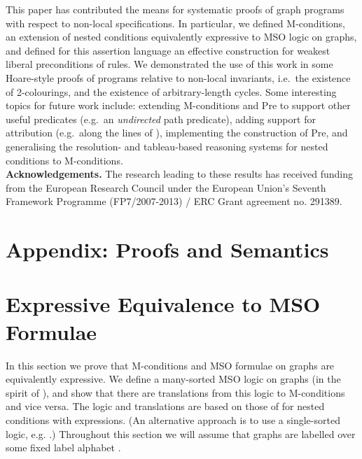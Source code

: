 \documentclass{llncs}
\begin{document}
	This paper has contributed the means for systematic proofs of graph programs with respect to non-local specifications. In particular, we defined M-conditions, an extension of nested conditions equivalently expressive to MSO logic on graphs, and defined for this assertion language an effective construction for weakest liberal preconditions of rules. We demonstrated the use of this work in some Hoare-style proofs of programs relative to non-local invariants, i.e.\ the existence of 2-colourings, and the existence of arbitrary-length cycles. Some interesting topics for future work include: extending M-conditions and Pre to support other useful predicates (e.g.\ an \emph{undirected} path predicate), adding support for attribution (e.g.\ along the lines of \cite{Poskitt-Plump12a,Poskitt13a}), implementing the construction of Pre, and generalising the resolution- and tableau-based reasoning systems for nested conditions \cite{Pennemann08a,Lambers-Orejas14a} to M-conditions.\\
	
	\noindent \textbf{Acknowledgements.} The research leading to these results has received funding from the
	European Research Council under the European Union's Seventh Framework
	Programme (FP7/2007-2013) / ERC Grant agreement no. 291389.

	
	
	
	
	\newpage\appendix
	
	\section*{Appendix: Proofs and Semantics}
	
	\section{Expressive Equivalence to MSO Formulae}\label{app:proofs:expressiveness}
	
	In this section we prove that M-conditions and MSO formulae on graphs are equivalently expressive. We define a many-sorted MSO logic on graphs (in the spirit of \cite{Courcelle90a}), and show that there are translations from this logic to M-conditions and vice versa. The logic and translations are based on those of \cite{Poskitt13a} for nested conditions with expressions. (An alternative approach is to use a single-sorted logic, e.g. \cite{Habel-Radke10a}.) Throughout this section we will assume that graphs are labelled over some fixed label alphabet .
	
\end{document}
